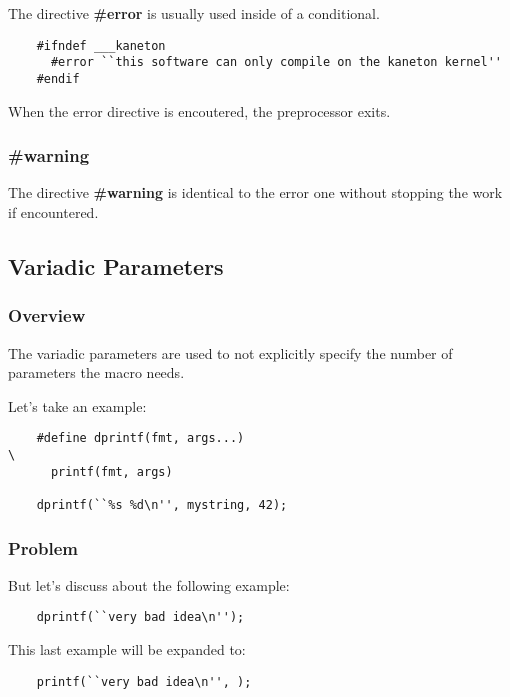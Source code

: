 {\begin{frame}[containsverbatim]
  The directive \textbf{\#error} is usually used inside of a conditional.

  \begin{verbatim}
    #ifndef ___kaneton
      #error ``this software can only compile on the kaneton kernel''
    #endif
  \end{verbatim}

  When the error directive is encoutered, the preprocessor exits.
\end{frame}


\begin{frame}
  \frametitle{\textbf{\#warning}}

    The directive \textbf{\#warning} is identical to the error one
    without stopping the work if encountered.
\end{frame}

%
%

\subsection{Variadic Parameters}


\begin{frame}[containsverbatim]
  \frametitle{Overview}

  The variadic parameters are used to not explicitly specify the number
  of parameters the macro needs.

  \nl

  Let's take an example:

  \begin{verbatim}
    #define dprintf(fmt, args...)                                       \
      printf(fmt, args)

    dprintf(``%s %d\n'', mystring, 42);
  \end{verbatim}
\end{frame}


\begin{frame}[containsverbatim]
  \frametitle{Problem}

  But let's discuss about the following example:

  \begin{verbatim}
    dprintf(``very bad idea\n'');
  \end{verbatim}

  This last example will be expanded to:

  \begin{verbatim}
    printf(``very bad idea\n'', );
  \end{verbatim}


\end{frame}}
